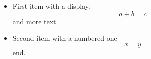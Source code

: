 \documentclass[10pt]{article}
\begin{document}
\begin{itemize}
\item First item with a display:
\[ a + b = c \]
and more text.
\item Second item with a numbered one
\begin{equation} x = y \end{equation}
end.
\end{itemize}
\end{document}
